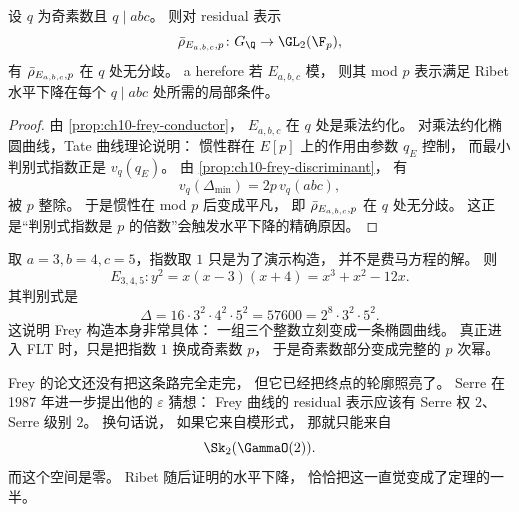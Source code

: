 \begin{proposition}
\label{prop:ch10-frey-unramified}
设 $q$ 为奇素数且 $q\mid abc$。
则对 residual 表示
\[
  \rhobar_{E_{a,b,c},p}\colon G_\Q\to \GL_2(\F_p),
\]
有 $\bar{\rho}_{E_{a,b,c},p}$ 在 $q$ 处无分歧。
	a
	herefore 若 $E_{a,b,c}$ 模，
则其 mod $p$ 表示满足 Ribet 水平下降在每个 $q\mid abc$ 处所需的局部条件。
\end{proposition}

\begin{proof}
由 \cref{prop:ch10-frey-conductor}，
$E_{a,b,c}$ 在 $q$ 处是乘法约化。
对乘法约化椭圆曲线，Tate 曲线理论说明：
惯性群在 $E[p]$ 上的作用由参数 $q_E$ 控制，
而最小判别式指数正是 $v_q(q_E)$。
由 \cref{prop:ch10-frey-discriminant}，
有
\[
  v_q(\Delta_{\min})=2p\,v_q(abc),
\]
被 $p$ 整除。
于是惯性在 mod $p$ 后变成平凡，
即 $\bar{\rho}_{E_{a,b,c},p}$ 在 $q$ 处无分歧。
这正是“判别式指数是 $p$ 的倍数”会触发水平下降的精确原因。
\end{proof}

\begin{example}[演示性的数值例子]
\label{ex:ch10-frey-345}
取 $a=3,b=4,c=5$，指数取 $1$ 只是为了演示构造，
并不是费马方程的解。
则
\[
  E_{3,4,5}\colon y^2=x(x-3)(x+4)=x^3+x^2-12x.
\]
其判别式是
\[
  \Delta=16\cdot 3^2\cdot 4^2\cdot 5^2=57600=2^8\cdot 3^2\cdot 5^2.
\]
这说明 Frey 构造本身非常具体：
一组三个整数立刻变成一条椭圆曲线。
真正进入 FLT 时，只是把指数 $1$ 换成奇素数 $p$，
于是奇素数部分变成完整的 $p$ 次幂。
\end{example}

Frey 的论文还没有把这条路完全走完，
但它已经把终点的轮廓照亮了。
Serre 在 1987 年进一步提出他的 $\varepsilon$ 猜想：
Frey 曲线的 residual 表示应该有 Serre 权 $2$、Serre 级别 $2$。
换句话说，
如果它来自模形式，
那就只能来自
\[
  \Sk_2(\GammaO(2)).
\]
而这个空间是零。
Ribet 随后证明的水平下降，
恰恰把这一直觉变成了定理的一半。


